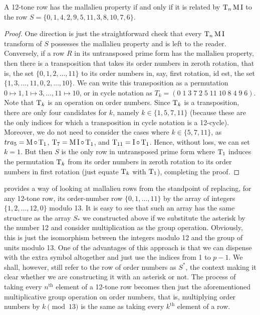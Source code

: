 \begin{proposition}
	\label{morris-mallalieu}
	\cite[17]{Morris1976}
	A 12-tone row has the mallalieu property if and only if it is related by $\operatorname{T}_n\operatorname{M}\operatorname{I}$
	to the row $S = \{ 0, 1, 4, 2, 9, 5, 11, 3, 8, 10, 7, 6 \}$.
	\begin{proof}
		One direction is just the straightforward check that every $\operatorname{T}_n\operatorname{M}\operatorname{I}$ transform of
		$S$ possesses the mallalieu property and is left to the reader. Conversely, if a
		row $R$ in its untransposed prime form has the mallalieu property, then there is
		a transposition that takes its order numbers in zeroth rotation, that is, the set
		$\{ 0, 1, 2, \dots, 11 \}$ to its order numbers in, say, first rotation, id est,
		the set $\{ 1, 3, \dots, 11, 0, 2, \dots, 10 \}$. We can write this transposition
		as a permutation $0 \mapsto 1, 1 \mapsto 3, \dots, 11 \mapsto 10 $, or in cycle
		notation as $T_k = ( 0 \; 1 \; 3 \; 7 \; 2 \; 5 \; 11 \; 10 \; 8 \; 4 \; 9 \; 6 )$.
		Note that $\operatorname{T}_k$ is an operation on order numbers. Since $\operatorname{T}_k$ is a transposition,
		there are only four candidates for $k$, namely $k \in \{ 1, 5, 7, 11 \}$
		(because these are the only indices for which a transposition in cycle notation is
		a 12-cycle). Moreover, we do not need to consider the cases where
		$k \in \{5, 7, 11\}$, as $tra_5 = \operatorname{M} \circ \operatorname{T}_1$, $\operatorname{T}_7 = \operatorname{M}\operatorname{I} \circ \operatorname{T}_1$,
		and $\operatorname{T}_{11} = \operatorname{I} \circ \operatorname{T}_1$. Hence, without loss, we can set $k = 1$. But then
		$S$ is the only row in untransposed prime form where $\operatorname{T}_1$ induces the permutation
		$\operatorname{T}_k$ from its order numbers in zeroth rotation to its order numbers in first
		rotation (just equate $\operatorname{T}_k$ with $\operatorname{T}_1$), completing the proof.
	\end{proof}
\end{proposition}

\cite[278]{Lewin1966} provides a way of looking at mallalieu rows from the standpoint of
replacing, for any 12-tone row, its order-number row $\{ 0, 1, \dots, 11 \}$ by the array
of integers $\{ 1, 2, \dots, 12, 0 \}$ modulo 13. It is easy to see that such an array has
the same structure as the array $S_*$ we constructed above if we substitute the asterisk
by the number 12 and consider multiplication as the group operation. Obviously, this is
just the isomorphism between the integers modulo 12 and the group of units modulo 13.
One of the advantages of this approach is that we can dispense with the extra symbol
altogether and just use the indices from 1 to $p - 1$. We shall, however, still refer to
the row of order numbers as $S^*$, the context making it clear whether we are constructing
it with an asterisk or not. The process of taking every $n^\text{th}$ element of a 12-tone
row becomes then just the aforementioned multiplicative group operation on order numbers,
that is, multiplying order numbers by $k \pmod{13}$ is the same as taking every
$k^\text{th}$ element of a row.

